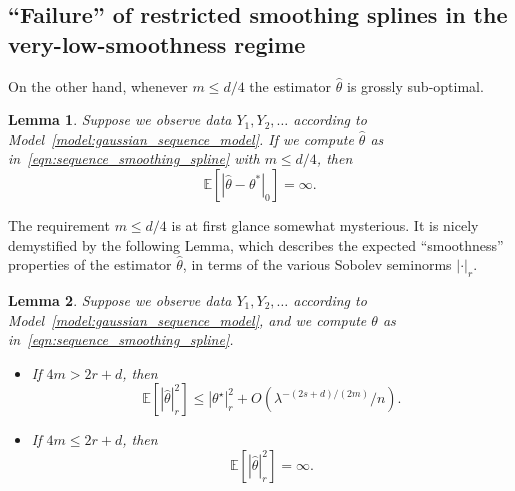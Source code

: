 \documentclass{article}
\newcommand{\1}{\mathbf{1}}
\newcommand{\Ebb}{\mathbb{E}}
\newcommand{\wh}[1]{\widehat{#1}}
\theoremstyle{alden}
\theoremstyle{aldenthm}
\newtheorem{lemma}{Lemma}
\theoremstyle{definition}
\theoremstyle{remark}
\begin{document}
\subsection{``Failure'' of restricted smoothing splines in the very-low-smoothness regime}
On the other hand, whenever $m \leq d/4$ the estimator $\wh{\theta}$ is grossly sub-optimal. 
\begin{lemma}
	\label{lem:failure_very_low_smoothness}
	Suppose we observe data $Y_1,Y_2,\ldots$ according to Model~\eqref{model:gaussian_sequence_model}. If we compute $\wh{\theta}$ as in~\eqref{eqn:sequence_smoothing_spline} with $m \leq d/4$, then
	\begin{equation}
	\label{eqn:failure_very_low_smoothness}
	\Ebb[|\wh{\theta} - \theta^{\ast}|_{0}] = \infty.
	\end{equation}
\end{lemma}
The requirement $m \leq d/4$ is at first glance somewhat mysterious. It is nicely demystified by the following Lemma, which describes the expected ``smoothness'' properties of the estimator $\wh{\theta}$, in terms of the various Sobolev seminorms $|\cdot|_r$.
\begin{lemma}
	\label{lem:smoothness_of_sequence_smoothing_splines}
	Suppose we observe data $Y_1,Y_2,\ldots$ according to Model~\eqref{model:gaussian_sequence_model}, and we compute $\theta$ as in~\eqref{eqn:sequence_smoothing_spline}.
	\begin{itemize}
		\item If $4m > 2r + d$, then
		\begin{equation}
		\label{eqn:smoothness_of_sequence_smoothing_splines_1}
		\Ebb[|\wh{\theta}|_{r}^2] \leq |\theta^{\star}|_r^2 + O(\lambda^{-(2s + d)/(2m)}/n).
		\end{equation}
		\item If $4m \leq 2r + d$, then 
		\begin{equation}
		\label{eqn:smoothness_of_sequence_smoothing_splines_2}
		\Ebb[|\wh{\theta}|_{r}^2] = \infty.
		\end{equation}
	\end{itemize}
\end{lemma}
\end{document}
